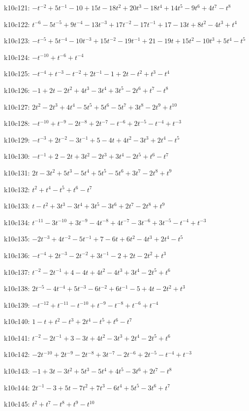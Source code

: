k10c121: $-t^{-2}+5t^{-1}-10+15t-18t^{2}+20t^{3}-18t^{4}+14t^{5}-9t^{6}+4t^{7}-t^{8}$

k10c122: $t^{-6}-5t^{-5}+9t^{-4}-13t^{-3}+17t^{-2}-17t^{-1}+17-13t+8t^{2}-4t^{3}+t^{4}$

k10c123: $-t^{-5}+5t^{-4}-10t^{-3}+15t^{-2}-19t^{-1}+21-19t+15t^{2}-10t^{3}+5t^{4}-t^{5}$

k10c124: $-t^{-10}+t^{-6}+t^{-4}$

k10c125: $-t^{-4}+t^{-3}-t^{-2}+2t^{-1}-1+2t-t^{2}+t^{3}-t^{4}$

k10c126: $-1+2t-2t^{2}+4t^{3}-3t^{4}+3t^{5}-2t^{6}+t^{7}-t^{8}$

k10c127: $2t^{2}-2t^{3}+4t^{4}-5t^{5}+5t^{6}-5t^{7}+3t^{8}-2t^{9}+t^{10}$

k10c128: $-t^{-10}+t^{-9}-2t^{-8}+2t^{-7}-t^{-6}+2t^{-5}-t^{-4}+t^{-3}$

k10c129: $-t^{-3}+2t^{-2}-3t^{-1}+5-4t+4t^{2}-3t^{3}+2t^{4}-t^{5}$

k10c130: $-t^{-1}+2-2t+3t^{2}-2t^{3}+3t^{4}-2t^{5}+t^{6}-t^{7}$

k10c131: $2t-3t^{2}+5t^{3}-5t^{4}+5t^{5}-5t^{6}+3t^{7}-2t^{8}+t^{9}$

k10c132: $t^{2}+t^{4}-t^{5}+t^{6}-t^{7}$

k10c133: $t-t^{2}+3t^{3}-3t^{4}+3t^{5}-3t^{6}+2t^{7}-2t^{8}+t^{9}$

k10c134: $t^{-11}-3t^{-10}+3t^{-9}-4t^{-8}+4t^{-7}-3t^{-6}+3t^{-5}-t^{-4}+t^{-3}$

k10c135: $-2t^{-3}+4t^{-2}-5t^{-1}+7-6t+6t^{2}-4t^{3}+2t^{4}-t^{5}$

k10c136: $-t^{-4}+2t^{-3}-2t^{-2}+3t^{-1}-2+2t-2t^{2}+t^{3}$

k10c137: $t^{-2}-2t^{-1}+4-4t+4t^{2}-4t^{3}+3t^{4}-2t^{5}+t^{6}$

k10c138: $2t^{-5}-4t^{-4}+5t^{-3}-6t^{-2}+6t^{-1}-5+4t-2t^{2}+t^{3}$

k10c139: $-t^{-12}+t^{-11}-t^{-10}+t^{-9}-t^{-8}+t^{-6}+t^{-4}$

k10c140: $1-t+t^{2}-t^{3}+2t^{4}-t^{5}+t^{6}-t^{7}$

k10c141: $t^{-2}-2t^{-1}+3-3t+4t^{2}-3t^{3}+2t^{4}-2t^{5}+t^{6}$

k10c142: $-2t^{-10}+2t^{-9}-2t^{-8}+3t^{-7}-2t^{-6}+2t^{-5}-t^{-4}+t^{-3}$

k10c143: $-1+3t-3t^{2}+5t^{3}-5t^{4}+4t^{5}-3t^{6}+2t^{7}-t^{8}$

k10c144: $2t^{-1}-3+5t-7t^{2}+7t^{3}-6t^{4}+5t^{5}-3t^{6}+t^{7}$

k10c145: $t^{2}+t^{7}-t^{8}+t^{9}-t^{10}$

